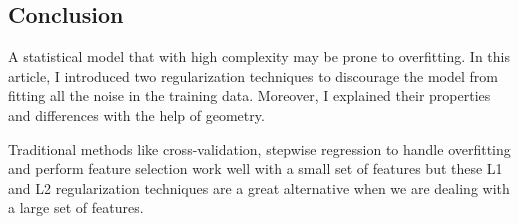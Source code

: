 \subsection{Conclusion}

A statistical model that with high complexity may be prone to overfitting. In this article, I introduced two regularization techniques to discourage the model from fitting all the noise in the training data. Moreover, I explained their properties and differences with the help of geometry.

Traditional methods like cross-validation, stepwise regression to handle overfitting and perform feature selection work well with a small set of features but these L1 and L2 regularization techniques are a great alternative when we are dealing with a large set of features.



